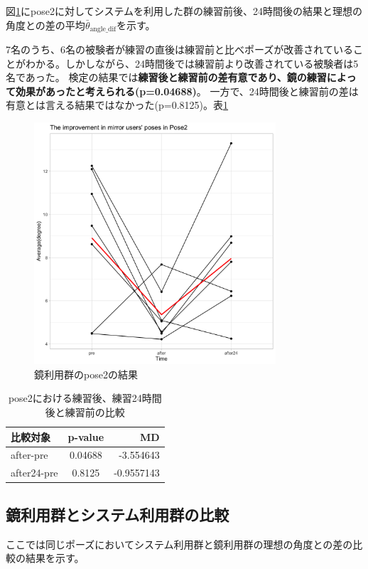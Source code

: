         図\ref{fig:pose2_mirror}にpose2に対してシステムを利用した群の練習前後、24時間後の結果と理想の角度との差の平均\(\bar{\theta}_{\text{angle\_dif}}\)を示す。


      7名のうち、6名の被験者が練習の直後は練習前と比べポーズが改善されていることがわかる。しかしながら、24時間後では練習前より改善されている被験者は5名であった。
      検定の結果では{\bf 練習後と練習前の差有意であり、鏡の練習によって効果があったと考えられる(p=0.04688)}。 一方で、24時間後と練習前の差は有意とは言える結果ではなかった(p=0.8125)。表\ref{table:pose2_mirror_p_value}
      \begin{figure}[H]
        \begin{center}
        \includegraphics[width=9cm]{figures/pose2_system_false_graph.png}
        \caption{鏡利用群のpose2の結果}
        \label{fig:pose2_mirror}
        \end{center}
      \end{figure}

      \begin{table}[ht]
        \centering
        \caption{pose2における練習後、練習24時間後と練習前の比較}
        \begin{tabular}{lcr}
        \hline
        \textbf{比較対象} & \textbf{p-value} & \textbf{MD} \\ \hline
        after-pre & 0.04688 & -3.554643 \\ \hline
        after24-pre & 0.8125 & -0.9557143 \\ \hline
        \end{tabular}
        \label{table:pose2_mirror_p_value}
        \end{table}

  \subsection{鏡利用群とシステム利用群の比較}
    ここでは同じポーズにおいてシステム利用群と鏡利用群の理想の角度との差の比較の結果を示す。

